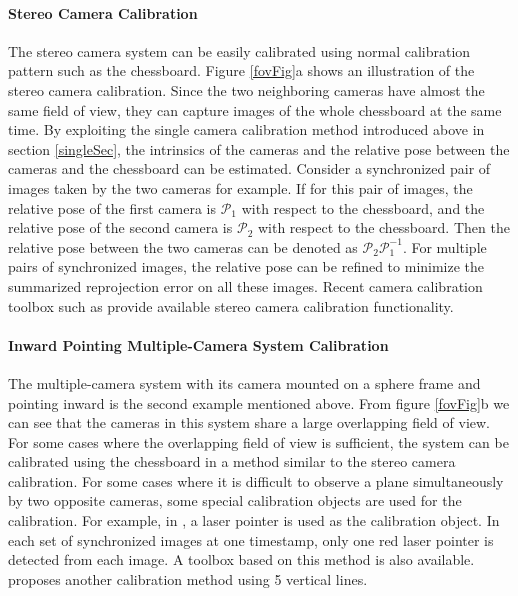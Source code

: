 \documentclass{report}
\begin{document}
\paragraph{Stereo Camera Calibration} 
The stereo camera system can be easily calibrated using normal calibration pattern such as the chessboard. Figure \ref{fovFig}a shows an illustration of the stereo camera calibration. Since the two neighboring cameras have almost the same field of view, they can capture images of the whole chessboard at the same time. By exploiting the single camera calibration method introduced above in section \ref{singleSec}, the intrinsics of the cameras and the relative pose between the cameras and the chessboard can be estimated. Consider a synchronized pair of images taken by the two cameras for example. If for this pair of images, the relative pose of the first camera is $\mathcal{P}_1$ with respect to the chessboard, and the relative pose of the second camera is $\mathcal{P}_2$ with respect to the chessboard. Then the relative pose between the two cameras can be denoted as $\mathcal{P}_2 \mathcal{P}_1^{-1}$. For multiple pairs of synchronized images, the relative pose can be refined to minimize the summarized reprojection error on all these images. Recent camera calibration toolbox such as \cite{bouguet2004camera, opencv_library} provide available stereo camera calibration functionality. 

\paragraph{Inward Pointing Multiple-Camera System Calibration }
The multiple-camera system with its camera mounted on a sphere frame and pointing inward is the second example mentioned above. From figure \ref{fovFig}b we can see that the cameras in this system share a large overlapping field of view. For some cases where the overlapping field of view is sufficient, the system can be calibrated using the chessboard in a method similar to the stereo camera calibration. For some cases where it is difficult to observe a plane simultaneously by two opposite cameras, some special calibration objects are used for the calibration. For example, in \cite{svoboda2005convenient}, a laser pointer is used as the calibration object. In each set of synchronized images at one timestamp, only one red laser pointer is detected from each image. A toolbox based on this method is also available. \cite{kong2013camera} proposes another calibration method using 5 vertical lines. 
\end{document}
